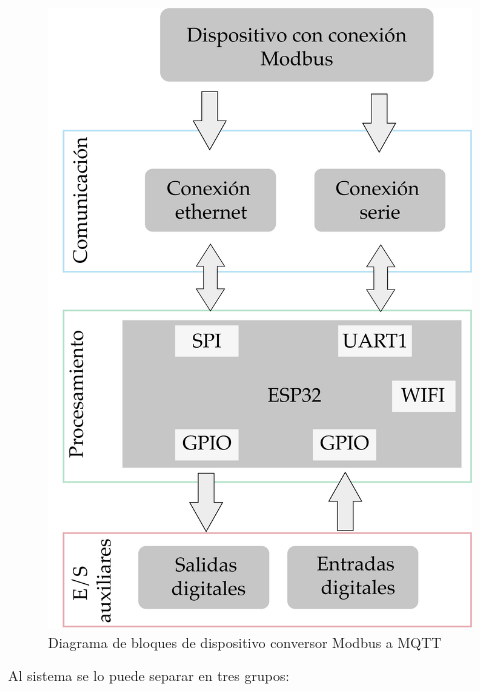 \begin{figure}[htpb]
	\centering
	\includegraphics[scale=.35]{./Figures/diagrama_dispositivo.png}
	\caption[Diagrama de bloques de dispositivo conversor ]{Diagrama de bloques de dispositivo conversor Modbus a MQTT}
	\label{fig:dev-conv}
\end{figure}

Al sistema se lo puede separar en tres grupos:

